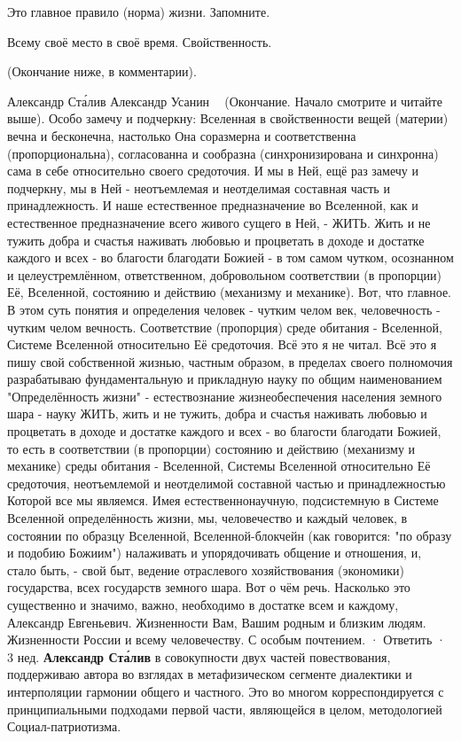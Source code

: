 \begin{itemize}
Это главное правило (норма) жизни. Запомните.

Всему своё место в своё время. Свойственность.

(Окончание ниже, в комментарии).

\begin{itemize} %
Александр Ста́лив
Александр Усанин 💖😊
(Окончание. Начало смотрите и читайте выше).
Особо замечу и подчеркну: Вселенная в свойственности вещей (материи) вечна и бесконечна, настолько Она соразмерна и соответственна (пропорциональна), согласованна и сообразна (синхронизирована и синхронна) сама в себе относительно своего средоточия. И мы в Ней, ещё раз замечу и подчеркну, мы в Ней - неотъемлемая и неотделимая составная часть и принадлежность.
И наше естественное предназначение во Вселенной, как и естественное предназначение всего живого сущего в Ней, - ЖИТЬ. Жить и не тужить добра и счастья наживать любовью и процветать в доходе и достатке каждого и всех - во благости благодати Божией - в том самом чутком, осознанном и целеустремлённом, ответственном, добровольном соответствии (в пропорции) Её, Вселенной, состоянию и действию (механизму и механике).
Вот, что главное. В этом суть понятия и определения человек - чутким челом век, человечность - чутким челом вечность. Соответствие (пропорция) среде обитания - Вселенной, Системе Вселенной относительно Её средоточия.
Всё это я не читал. Всё это я пишу свой собственной жизнью, частным образом, в пределах своего полномочия разрабатываю фундаментальную и прикладную науку по общим наименованием "Определённость жизни" - естествознание жизнеобеспечения населения земного шара - науку ЖИТЬ, жить и не тужить, добра и счастья наживать любовью и процветать в доходе и достатке каждого и всех - во благости благодати Божией, то есть в соответствии (в пропорции) состоянию и действию (механизму и механике) среды обитания - Вселенной, Системы Вселенной относительно Её средоточия, неотъемлемой и неотделимой составной частью и принадлежностью Которой все мы являемся.
Имея естественнонаучную, подсистемную в Системе Вселенной определённость жизни, мы, человечество и каждый человек, в состоянии по образцу Вселенной, Вселенной-блокчейн (как говорится: "по образу и подобию Божиим") налаживать и упорядочивать общение и отношения, и, стало быть, - свой быт, ведение отраслевого хозяйствования (экономики) государства, всех государств земного шара.
Вот о чём речь. Насколько это существенно и значимо, важно, необходимо в достатке всем и каждому, Александр Евгеньевич.
Жизненности Вам, Вашим родным и близким людям.
Жизненности России и всему человечеству.
С особым почтением.
 · Ответить · 3 нед.
\textbf{Александр Ста́лив} в совокупности двух частей повествования, поддерживаю автора во взглядах в метафизическом сегменте диалектики и интерполяции гармонии общего и частного.
Это во многом корреспондируется с принципиальными подходами первой части, являющейся в целом, методологией Социал-патриотизма.


\end{itemize}
\end{itemize}
